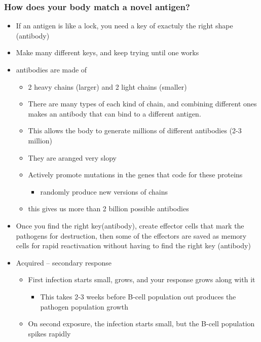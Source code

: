 \documentclass{article}
\theoremstyle{definition}
\begin{document}
\subsubsection{How does your body match a novel antigen?}
\begin{itemize}
	\item If an antigen is like a lock, you need a key of exactuly the right shape (antibody)
	\item Make many different keys, and keep trying until one works
	\item antibodies are made of
		\begin{itemize}
			\item 2 heavy chains (larger) and 2 light chains (smaller)
			\item There are many types of each kind of chain, and combining different ones makes an antibody that can bind to a different antigen.
			\item This allows the body to generate millions of different antibodies (2-3 million)
			\item  They are aranged very slopy
			\item Actively promote mutations in the genes that code for these proteins
				\begin{itemize}
					\item randomly produce new versions of chains
				\end{itemize}
			\item this gives us more than 2 billion possible antibodies
		\end{itemize}
	\item Once you find the right key(antibody), create effector cells that mark the pathogens for destruction, then some of the effectors are saved as memory cells for rapid reactivaation without having to find the right key (antibody)
	\item Acquired -- secondary response
		\begin{itemize}
			\item First infection starts small, grows, and your response grows along with it
				\begin{itemize}
					\item This takes 2-3 weeks before B-cell population out produces the pathogen population growth
				\end{itemize}
			\item On second exposure, the infection starts small, but the B-cell population spikes rapidly
				\begin{itemize}

\end{itemize}
\end{itemize}
\end{itemize}
\end{document}

